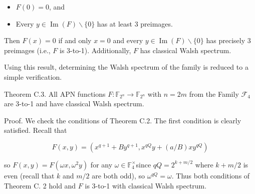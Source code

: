 \documentclass[10pt]{article}
\begin{document}
\begin{itemize}
  \item $F(0)=0$, and
  \item Every $y \in \operatorname{Im}(F) \backslash\{0\}$ has at least 3 preimages.
\end{itemize}

Then $F(x)=0$ if and only $x=0$ and every $y \in \operatorname{Im}(F) \backslash\{0\}$ has precisely 3 preimages (i.e., $F$ is 3-to-1). Additionally, $F$ has classical Walsh spectrum.

Using this result, determining the Walsh spectrum of the family is reduced to a simple verification.

Theorem C.3. All APN functions $F: \mathbb{F}_{2^{n}} \rightarrow \mathbb{F}_{2^{n}}$ with $n=2 m$ from the Family $\mathcal{F}_{4}$ are 3-to-1 and have classical Walsh spectrum.

Proof. We check the conditions of Theorem C.2. The first condition is clearly satisfied. Recall that

$$
F(x, y)=\left(x^{q+1}+B y^{q+1}, x^{q Q} y+(a / B) x y^{q Q}\right)
$$

so $F(x, y)=F\left(\omega x, \omega^{2} y\right)$ for any $\omega \in \mathbb{F}_{4}^{\times}$since $q Q=2^{k+m / 2}$ where $k+m / 2$ is even (recall that $k$ and $m / 2$ are both odd), so $\omega^{q Q}=\omega$. Thus both conditions of Theorem C. 2 hold and $F$ is 3-to-1 with classical Walsh spectrum.
\end{document}
